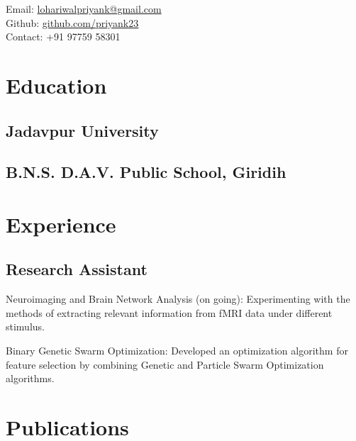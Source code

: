 \documentclass[]{deedy-resume-openfont}
\begin{document}
\lastupdated

{
	Email: \href{mailto:lohariwalpriyank@gmail.com}{lohariwalpriyank@gmail.com}\\
	Github: \href{http://github.com/priyank23}{github.com/priyank23}\\
	Contact: +91 97759 58301
}


\begin{minipage}[t]{0.55\textwidth} 

\section{Education} 

\subsection{Jadavpur University}
\sectionsep

\subsection{B.N.S. D.A.V. Public School, Giridih}
\sectionsep


\section{Experience}
\subsection{Research Assistant}
\sectionsep
\begin{tightemize}
	\item Neuroimaging and Brain Network Analysis (on going): 
	Experimenting with the methods of extracting relevant 
	information from fMRI data under different stimulus.
    	\item Binary Genetic Swarm Optimization: 
	Developed an optimization algorithm for feature selection 
	by combining Genetic and Particle Swarm Optimization algorithms.
	\end{tightemize}
\sectionsep

\section{Publications} 
\renewcommand\refname{\vskip -1.5em} %


\nocite{*}


\end{minipage}
\end{document}
